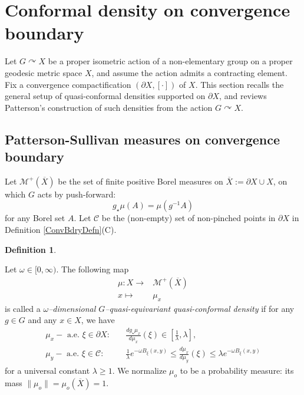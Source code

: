 \documentclass{amsart}
\theoremstyle{definition}
\newtheorem{defn}[thm]{Definition}
\theoremstyle{remark}
\newtheorem*{rem}{Remark}
\newcommand{\act}{\curvearrowright}
\newcommand{\U}{ X}
\newcommand{\bU}{\overline{  X}}
\newcommand{\pU}{\partial{  X}}
\begin{document}
\section{Conformal density on  convergence boundary}\label{SecDensity}

Let $G\curvearrowright \U$ be a proper isometric action of a non-elementary group on a proper geodesic metric space $\U$, and assume the action admits a contracting element. Fix a convergence compactification $(\pU, [\cdot])$ of $\U$. This section recalls the general setup of quasi-conformal densities supported on $\pU$, and reviews Patterson’s construction of such densities from the action $G\curvearrowright \U$.







\subsection{Patterson-Sullivan measures on convergence boundary}  
 
Let $ \mathcal M^+(\bU)$ be the set of finite positive Borel measures on $\bU:=\pU\cup\U$, on which  $G$ acts  by push-forward: $$g_\star\mu(A)=\mu(g^{-1}A)$$ 
for any Borel set $A$. Let $\mathcal{C}$ be the (non-empty) set of non-pinched points in $\pU$ in Definition \ref{ConvBdryDefn}(C).
\begin{defn}\label{ConformalDensityDefn}

Let $\omega \in [0, \infty)$. The following  map 
$$\begin{aligned}
\mu: \U \longrightarrow &\mathcal M^+(\bU) \\
x \longmapsto &\mu_x    
\end{aligned}$$
is called a 
\textit{$\omega$--dimensional $G$--quasi-equivariant quasi-conformal density}  if for any $g\in G$ and any $x\in \U$, we have
\begin{align}
\label{almostInv}
\mu_x-\textrm{ a.e. } \xi\in \pU: &\quad
\frac{dg_\star\mu_{x}}{d\mu_{x}}(\xi) \in [\frac{1}{\lambda}, \lambda],\\
\label{confDeriv}
\mu_y-\textrm{ a.e. } \xi\in \mathcal C: &\quad
\frac{1}{\lambda} e^{-\omega B_\xi (x, y)}  \le  \frac{d\mu_{x}}{d\mu_{y}}(\xi) \le \lambda e^{-\omega B_\xi (x, y)}
\end{align}
for a  universal constant $\lambda\ge 1$.  We normalize $\mu_o$ to be a probability measure: its mass $\|\mu_o\|=\mu_o(\bU)=1$.
\end{defn}
\end{document}
